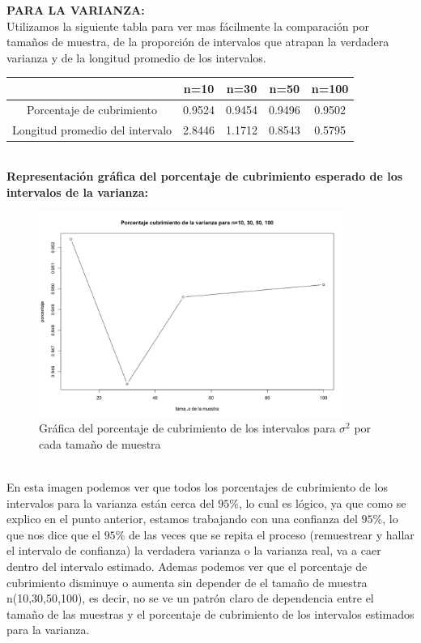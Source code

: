 \documentclass[letterpaper,12pt,onecolumn,titlepage]{article}
\begin{document}
\pagebreak \textbf{PARA LA VARIANZA:}
~\\ Utilizamos la siguiente tabla para ver mas f\'{a}cilmente la comparaci\'{o}n por tama\~{n}os de muestra, de la proporci\'{o}n de intervalos que atrapan la verdadera varianza y de la longitud promedio de los intervalos.
\begin{center}
\begin{tabular}{|c|c|c|c|c|}
\hline 
\rule[-1ex]{0pt}{2.5ex}  & n=10 & n=30 & n=50 & n=100 \\ 
\hline 
\rule[-1ex]{0pt}{2.5ex} Porcentaje de cubrimiento & 0.9524 & 0.9454 & 0.9496 & 0.9502 \\ 
\hline 
\rule[-1ex]{0pt}{2.5ex} Longitud promedio del intervalo & 2.8446 & 1.1712 & 0.8543 & 0.5795 \\ 
\hline 
\end{tabular} 
\end{center}
~\\\textbf{Representaci\'{o}n gr\'{a}fica del porcentaje de cubrimiento esperado de los intervalos de la varianza:}
~\\ \begin{figure}[!h]
    \begin{center}
        \includegraphics[width=10cm]{Figuras/Pb1.png}
        \caption{Gr\'{a}fica del porcentaje de cubrimiento de los intervalos para $\sigma^2$ por cada tama\~{n}o de muestra}
        \label{fig:Densidad}
    \end{center}
\end{figure}
~\\ En esta imagen podemos ver que todos los porcentajes de cubrimiento de los intervalos para la varianza est\'{a}n cerca del $95\%$, lo cual es l\'{o}gico, ya que como se explico en el punto anterior, estamos trabajando con una confianza del $95\%$, lo que nos dice que el $95\%$ de las veces que se repita el proceso (remuestrear y hallar el intervalo de confianza) la verdadera varianza o la varianza real, va a caer dentro del intervalo estimado. Ademas podemos ver que el porcentaje de cubrimiento disminuye o aumenta sin depender de el tama\~{n}o de muestra n(10,30,50,100), es decir, no se ve un patr\'{o}n claro de dependencia entre el tama\~{n}o de las muestras y el porcentaje de cubrimiento de los intervalos estimados para la varianza.
\end{document}
